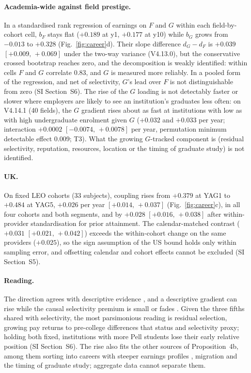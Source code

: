 \documentclass[11pt]{article}
\newcommand{\SI}[1]{SI Section~S#1}
\newcommand{\ci}[2]{$[#1,\allowbreak\,#2]$}
\begin{document}
\paragraph{Academia-wide against field prestige.} In a standardised rank regression of earnings on $F$ and $G$
within each field-by-cohort cell, $b_F$ stays flat ($+0.189$ at y1, $+0.177$ at y10) while $b_G$ grows from
$-0.013$ to $+0.328$ (Fig.~\ref{fig:career}d). Their slope difference $d_G-d_F$ is $+0.039$ \ci{+0.009}{+0.069}
under the two-way variance (V4.13.0), but the conservative crossed bootstrap reaches zero, and the decomposition is
weakly identified: within cells $F$ and $G$ correlate 0.83, and $G$ is measured more reliably. In a pooled form of
the regression, and net of selectivity, $G$'s lead over $F$ is not distinguishable from zero (\SI{6}). The rise of the $G$ loading is not detectably faster or slower where employers are likely to see an institution's
graduates less often: on V4.14.1 (40 fields), the $G$ gradient rises about as fast at institutions with low as
with high undergraduate enrolment given $G$ ($+0.032$ and $+0.033$ per year; interaction $+0.0002$
\ci{-0.0074}{+0.0078} per year, permutation minimum detectable effect 0.009; T3). What the growing $G$-tracked component is (residual selectivity,
reputation, resources, location or the timing of graduate study) is not identified.

\paragraph{UK.} On fixed LEO cohorts (33 subjects), coupling rises from $+0.379$ at YAG1 to $+0.484$ at YAG5,
$+0.026$ per year \ci{+0.014}{+0.037} (Fig.~\ref{fig:career}c), in all four cohorts and both segments, and by
$+0.028$ \ci{+0.016}{+0.038} after within-provider standardisation for prior attainment. The calendar-matched
contrast ($+0.031$ \ci{+0.021}{+0.042}) exceeds the within-cohort change on the same providers ($+0.025$), so the
sign assumption of the US bound holds only within sampling error, and offsetting calendar and cohort effects
cannot be excluded (\SI{5}).

\paragraph{Reading.} The direction agrees with descriptive evidence \citep{thomas2005postbaccalaureate,
macleod2017big}, and a descriptive gradient can rise while the causal selectivity premium is small or fades
\citep{dale2014estimating, mountjoy2021returns}. Given the three fifths shared with selectivity, the most
parsimonious reading is residual selection, growing pay returns to pre-college differences that status and
selectivity proxy; holding both fixed, institutions with more Pell students lose their early relative position
(\SI{6}). The rise also fits the other sources of Proposition~4b, among them sorting into careers with steeper
earnings profiles \citep{binder2016career, rivera2015pedigree}, migration and the timing of graduate study;
aggregate data cannot separate them.
\end{document}
